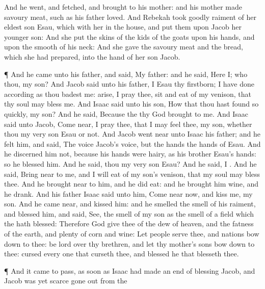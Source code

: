 {And he
went, and
fetched, and
brought
{} to his
mother: and his
mother
made savoury
meat, such as his
father
loved.
And
Rebekah
took
goodly
raiment of her
eldest
son
Esau, which
{} with her in the
house, and put them
upon
Jacob her
younger
son:
And she
put the
skins of the
kids of the
goats upon his
hands, and upon the
smooth of his
neck:
And she
gave the savoury
meat and the
bread, which she had
prepared, into the
hand of her
son
Jacob.
\par }{\PP {}¶ And he
came unto his
father, and
said, My
father: and he
said, Here
{} I; who
{} thou, my
son?
And
Jacob
said unto his
father, I
{}
Esau thy
firstborn; I have
done according as thou
badest me:
arise, I pray thee,
sit and
eat of my
venison, that thy
soul may
bless me.
And
Isaac
said unto his
son, How
{} that thou hast
found
{} so
quickly, my
son? And he
said, Because the
{} thy
God
brought
{} to
me.
And
Isaac
said unto
Jacob, Come
near, I pray thee, that I may
feel thee, my
son, whether thou
{} my
very
son
Esau or not.
And
Jacob went
near unto
Isaac his
father; and he
felt him, and
said, The
voice
{}
Jacob’s
voice, but the
hands
{} the
hands of
Esau.
And he
discerned him not, because his
hands were
hairy, as his
brother
Esau’s
hands: so he
blessed him.
And he
said,
{} thou my very
son
Esau? And he
said, I
{}.
And he
said, Bring
{}
near to me, and I will
eat of my
son’s
venison, that my
soul may
bless thee. And he brought
{}
near to him, and he did
eat: and he
brought him
wine, and he
drank.
And his
father
Isaac
said unto him, Come
near now, and
kiss me, my
son.
And he came
near, and
kissed him: and he
smelled the
smell of his
raiment, and
blessed him, and
said,
See, the
smell of my
son
{} as the
smell of a
field which the
{} hath
blessed:
Therefore
God
give thee of the
dew of
heaven, and the
fatness of the
earth, and
plenty of
corn and
wine:
Let
people
serve thee, and
nations bow
down to thee:
be
lord over thy
brethren, and let thy
mother’s
sons bow
down to thee:
cursed
{} every one that
curseth thee, and
blessed
{} he that
blesseth thee.
\par }{\PP {}¶ And it came to pass, as soon as
Isaac had made an
end of
blessing
Jacob, and
Jacob was
yet
scarce gone
out from the
}
